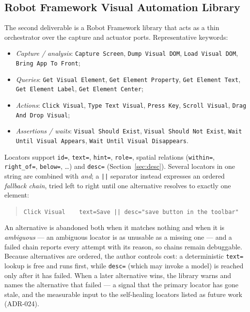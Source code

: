\documentclass[11pt,a4paper]{article}
\newcommand{\code}[1]{\texttt{#1}}
\begin{document}
\subsection{Robot Framework Visual Automation Library}
The second deliverable is a Robot Framework library \cite{robotframework} that acts
as a thin orchestrator over the capture and actuator ports. Representative keywords:
\begin{itemize}[leftmargin=1.4em]
  \item \emph{Capture / analysis}: \code{Capture Screen}, \code{Dump Visual DOM},
        \code{Load Visual DOM}, \code{Bring App To Front};
  \item \emph{Queries}: \code{Get Visual Element}, \code{Get Element Property},
        \code{Get Element Text}, \code{Get Element Label}, \code{Get Element Center};
  \item \emph{Actions}: \code{Click Visual}, \code{Type Text Visual},
        \code{Press Key}, \code{Scroll Visual}, \code{Drag And Drop Visual};
  \item \emph{Assertions / waits}: \code{Visual Should Exist},
        \code{Visual Should Not Exist}, \code{Wait Until Visual Appears},
        \code{Wait Until Visual Disappears}.
\end{itemize}
Locators support \code{id=}, \code{text=}, \code{hint=}, \code{role=}, spatial
relations (\code{within=}, \code{right\_of=}, \code{below=}, \dots) and
\code{desc=} (Section~\ref{sec:desc}). Several locators in one string are
combined with \emph{and}; a \code{||} separator instead expresses an ordered
\emph{fallback chain}, tried left to right until one alternative resolves to
exactly one element:

\begin{quote}\small
\code{Click Visual~~~~text=Save || desc="save button in the toolbar"}
\end{quote}

\noindent An alternative is abandoned both when it matches nothing and when it is
\emph{ambiguous} --- an ambiguous locator is as unusable as a missing one --- and a
failed chain reports every attempt with its reason, so chains remain debuggable.
Because alternatives are ordered, the author controls cost: a deterministic
\code{text=} lookup is free and runs first, while \code{desc=} (which may invoke a
model) is reached only after it has failed. When a later alternative wins, the
library warns and names the alternative that failed --- a signal that the primary
locator has gone stale, and the measurable input to the self-healing locators
listed as future work (ADR-024).
\end{document}
